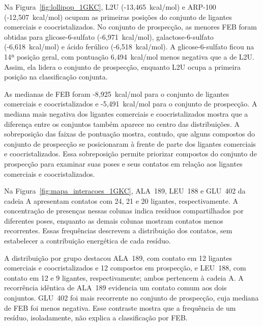 Na Figura~\ref{fig:lollipop_1GKC}, L2U (-13,465~kcal/mol) e ARP-100 (-12,507~kcal/mol) ocupam as primeiras posições do conjunto de ligantes comerciais e coocristalizados. No conjunto de prospecção, as menores FEB foram obtidas para glicose-6-sulfato (-6,971~kcal/mol), galactose-6-sulfato (-6,618~kcal/mol) e ácido ferúlico (-6,518~kcal/mol). A glicose-6-sulfato ficou na 14ª posição geral, com pontuação 6,494~kcal/mol menos negativa que a de L2U. Assim, ela lidera o conjunto de prospecção, enquanto L2U ocupa a primeira posição na classificação conjunta.

As medianas de FEB foram -8,925~kcal/mol para o conjunto de ligantes comerciais e coocristalizados e -5,491~kcal/mol para o conjunto de prospecção. A mediana mais negativa dos ligantes comerciais e coocristalizados mostra que a diferença entre os conjuntos também aparece no centro das distribuições. A sobreposição das faixas de pontuação mostra, contudo, que alguns compostos do conjunto de prospecção se posicionaram à frente de parte dos ligantes comerciais e coocristalizados. Essa sobreposição permite priorizar compostos do conjunto de prospecção para examinar suas poses e seus contatos em relação aos ligantes comerciais e coocristalizados.


Na Figura~\ref{fig:mapa_interacoes_1GKC}, ALA~189, LEU~188 e GLU~402 da cadeia A apresentam contatos com 24, 21 e 20 ligantes, respectivamente. A concentração de presenças nessas colunas indica resíduos compartilhados por diferentes poses, enquanto as demais colunas mostram contatos menos recorrentes. Essas frequências descrevem a distribuição dos contatos, sem estabelecer a contribuição energética de cada resíduo.

A distribuição por grupo destacou ALA~189, com contato em 12 ligantes comerciais e coocristalizados e 12 compostos em prospecção, e LEU~188, com contato em 12 e 9 ligantes, respectivamente; ambos pertencem à cadeia A. A recorrência idêntica de ALA~189 evidencia um contato comum aos dois conjuntos. GLU~402 foi mais recorrente no conjunto de prospecção, cuja mediana de FEB foi menos negativa. Esse contraste mostra que a frequência de um resíduo, isoladamente, não explica a classificação por FEB.

